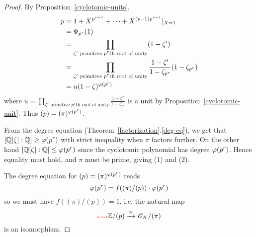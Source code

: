 \begin{proof}
By Proposition~\ref{cyclotomic-units},
\begin{align*}
p&=1+X^{p^{r-1}}+\cdots +X^{(p-1)p^{r-1}}|_{X=1}\\
&=\Phi_{p^r}(1)\\
&=\prod_{\zeta' \text{ primitive $p^r$th root of unity}}(1-\zeta')\\
&=\prod_{\zeta' \text{ primitive $p^r$th root of unity}}\frac{1-\zeta'}{1-\zeta_{p^r}}(1-\zeta_{p^r})\\
&=u(1-\zeta)^{\varphi(p^r)}
\end{align*}
where $u=\prod_{\zeta' \text{ primitive $p^r$th root of unity}}\frac{1-\zeta'}{1-\zeta_{p^r}}$ is a unit by Proposition~\ref{cyclotomic-unit}. Thus $(p)=(\pi)^{\varphi(p^r)}$.

From the degree equation (Theorem~\ref{factorization}.\ref{deg-eq}), we get that $[\mathbb{Q}[\zeta]:\mathbb{Q}]\ge \varphi(p^r)$ with strict inequality when $\pi$ factors further. On the other hand $[\mathbb{Q}[\zeta]:\mathbb{Q}]\le \varphi(p^r)$ since the cyclotomic polynomial has degree $\varphi(p^r)$. Hence equality must hold, and $\pi$ must be prime, giving (1) and (2).

The degree equation for $(p)=(\pi)^{\varphi(p^r)}$ reads
\[
\varphi(p^r)=f((\pi)/(p))\cdot \varphi(p^r)
\]
so we must have $f((\pi)/(p))=1$, i.e. the natural map \begin{equation}\llabel{f-is-1}
\Z/(p)\xra{\cong} \sO_K/(\pi)
\end{equation}
is an isomorphism.


\end{proof}
